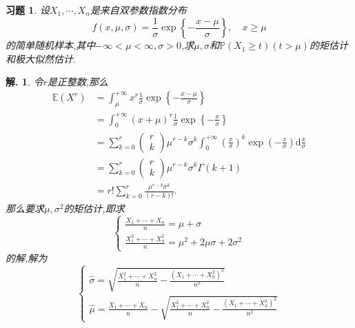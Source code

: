 \documentclass[a4paper,oneside,12pt]{ctexart}
\theoremstyle{plain}
\newtheorem{exercise}{习题}
\theoremstyle{nonumberplain}
\newtheorem{solution}{解.}
\theoremstyle{nonumberplain}
\newcommand{\dif}{\mathrm{d}}
\newcommand{\expect}{\mathbb{E}}
\newcommand{\prob}{\mathbb{P}}
\begin{document}
    \begin{exercise}
        \label{ex:2}
        设$X_1,\cdots,X_n$是来自双参数指数分布 
        \begin{equation*}
            f(x,\mu,\sigma)=\frac{1}{\sigma}\exp\left\{-\frac{x-\mu}{\sigma}\right\},\quad x\geqslant \mu
        \end{equation*}
        的简单随机样本,其中$-\infty<\mu<\infty,\sigma>0$,求$\mu,\sigma$和$\prob(X_1\geqslant t)(t>\mu)$的矩估计和极大似然估计.
    \end{exercise}

    \begin{solution}
        令$r$是正整数,那么 
        \begin{align*}
            \expect(X^r)&=\int_\mu^{+\infty}x^r\frac{1}{\sigma}\exp\left\{-\frac{x-\mu}{\sigma}\right\}\\
            &=\int_0^{+\infty}(x+\mu)^r\frac{1}{\sigma}\exp\left\{-\frac{x}{\sigma}\right\}\\
            &=\sum_{k=0}^r\left(\begin{array}{c}
                r\\
                k
            \end{array}\right)\mu^{r-k}\sigma^k\int_0^{+\infty}\left(\frac{x}{\sigma}\right)^k\exp\left(-\frac{x}{\sigma}\right)\dif \frac{x}{\sigma}\\
            &=\sum_{k=0}^r\left(\begin{array}{c}
                r\\
                k
            \end{array}\right)\mu^{r-k}\sigma^k\Gamma(k+1)\\
            &=r!\sum_{k=0}^r\frac{\mu^{r-k}\sigma^k}{(r-k)!}.
        \end{align*}
        那么要求$\mu,\sigma^2$的矩估计,即求 
        \begin{equation*}
            \begin{cases}
                \frac{X_1+\cdots+X_n}{n}=\mu+\sigma\\
                \frac{X_1^2+\cdots+X_n^2}{n}=\mu^2+2\mu\sigma+2\sigma^2
            \end{cases}
        \end{equation*}
        的解,解为 
        \begin{equation*}
            \begin{cases}
                \hat{\sigma}=\sqrt{\frac{X_1^2+\cdots+X_n^2}{n}-\frac{(X_1+\cdots+X_n^2)^2}{n^2}}\\
                \hat{\mu}=\frac{X_1+\cdots+X_n}{n}-\sqrt{\frac{X_1^2+\cdots+X_n^2}{n}-\frac{(X_1+\cdots+X_n^2)^2}{n^2}}
            \end{cases}
        \end{equation*}


\end{solution}
\end{document}
